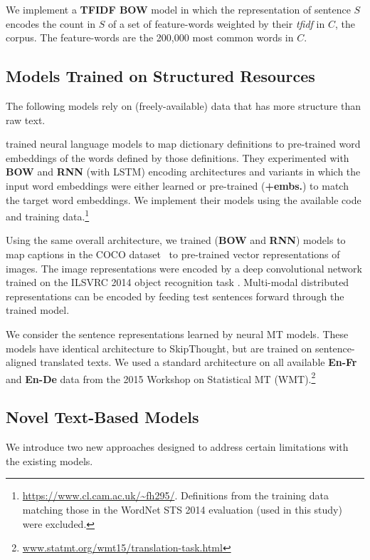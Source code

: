 \vspace{5pt} We implement a {\bf TFIDF BOW} model in which the representation of sentence \(S\) encodes the count in \(S\) of a set of feature-words weighted by their \emph{tfidf} in \(C\), the corpus. The feature-words are the 200,000 most common words in \(C\). 

\subsection{Models Trained on Structured Resources}
The following models rely on (freely-available) data that has more structure than raw text.

\vspace{5pt} \cite{hill2015learning} trained neural language models to map dictionary definitions to pre-trained word embeddings of the words defined by those definitions. They experimented with {\bf BOW} and {\bf RNN} (with LSTM) encoding architectures and variants in which the input word embeddings were either learned or pre-trained ({\bf+embs.}) to match the target word embeddings. We implement their models using the available code and training data.\footnote{{\scriptsize \url{https://www.cl.cam.ac.uk/~fh295/}}. Definitions from the training data matching those in the WordNet STS 2014 evaluation (used in this study) were excluded.}

\vspace{5pt} Using the same overall architecture, we trained ({\bf BOW} and {\bf RNN}) models to map captions in the COCO dataset~\cite{chen2015microsoft} to pre-trained vector representations of images. The image representations were encoded by a deep convolutional network \cite{szegedy2014going} trained on the ILSVRC 2014 object recognition task \cite{russakovsky2014imagenet}. Multi-modal distributed representations can be encoded by feeding test sentences forward through the trained model. 

\vspace{5pt} We consider the sentence representations learned by neural MT models. These models have identical architecture to SkipThought, but are trained on sentence-aligned translated texts. We used a standard architecture \cite{cho2014learning} on all available {\bf En-Fr} and {\bf En-De} data from the 2015 Workshop on Statistical MT (WMT).\footnote{\scriptsize \url{www.statmt.org/wmt15/translation-task.html}} 

\subsection{Novel Text-Based Models}
We introduce two new approaches designed to address certain limitations with the existing models.

